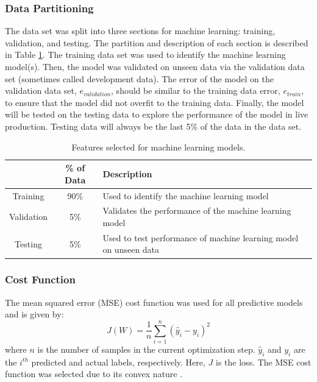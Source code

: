 \subsubsection{Data Partitioning}
The data set was split into three sections for machine learning: training, validation, and testing.  The partition and description of each section is described in Table \ref{tab:08datapart}. The training data set was used to identify the machine learning model(s).  Then, the model was validated on unseen data via the validation data set (sometimes called development data).  The error of the model on the validation data set, $e_{validation}$, should be similar to the training data error, $e_{train}$, to ensure that the model did not overfit to the training data. Finally, the model will be tested on the testing data to explore the performance of the model in live production.  Testing data will always be the last 5\% of the data in the data set.
\begin{table}[h]
    \centering
    {
    \begin{tabular}{ c | c | p{9cm}}
                            & \% of Data        &  Description \\
        \hline
        Training            &  90\%             
        &  Used to identify the machine learning model        \\
        
        Validation          &  5\%              
        &  Validates the performance of the machine learning model         \\
        
        Testing             &  5\%             
        &  Used to test performance of machine learning model on unseen data       \\             
    \end{tabular}}
    \caption{Features selected for machine learning models.}
    \label{tab:08datapart}
\end{table}

\subsubsection{Cost Function}

The mean squared error (MSE) cost function was used for all predictive models and is given by:
\begin{equation}
    J(W) = \frac{1}{n}\sum\limits^n_{i=1}(\hat{y}_i - y_i)^2
    \label{eq:08MSE}
\end{equation}
where $n$ is the number of samples in the current optimization step.  $\hat{y}_i$ and $y_i$ are the $i^{th}$ predicted and actual labels, respectively. Here, $J$ is the loss. The MSE cost function was selected due to its convex nature \cite{deeplearning_course}.

